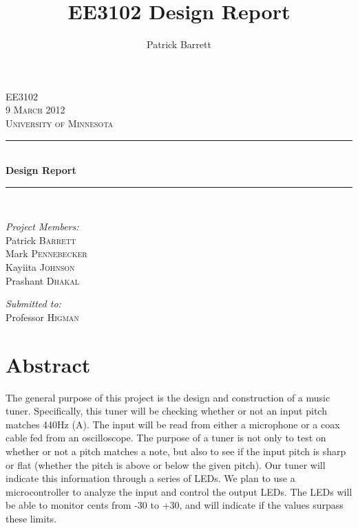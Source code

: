\documentclass[12pt]{article}
\title{EE3102 Design Report} %
\author{Patrick Barrett}
\date{}                                           %
\newcommand{\HRule}{\rule{\linewidth}{0.5mm}}
\begin{document}
\begin{singlespace}

\begin{center}
 
 

 
\textsc{\LARGE EE3102}\\[0.5cm]
 

\textsc{\Large 9 March 2012}\\[0.5cm]

\textsc{\Large University of Minnesota}\\[0.5cm]
 
 
\HRule \\[0.4cm]
{ \huge \bfseries Design Report}\\
 
\HRule \\[1cm]
 
\begin{minipage}{0.4\textwidth}
\begin{flushleft} \large
\emph{Project Members:}\\
Patrick \textsc{Barrett} \\
Mark \textsc{Pennebecker} \\
Kayiita  \textsc{Johnson} \\
Prashant \textsc{Dhakal} \\
\end{flushleft}
\end{minipage}
\begin{minipage}{0.4\textwidth}
\begin{flushright} \large
\emph{Submitted to:} \\
Professor \textsc{Higman}\\
\end{flushright}
\end{minipage}
\end{center}

\vfill

\section*{Abstract}
The general purpose of this project is the design and construction of a music tuner. Specifically, this
tuner will be checking whether or not an input pitch matches 440Hz (A). The input will be read from
either a microphone or a coax cable fed from an oscilloscope. The purpose of a tuner is not only to test
on whether or not a pitch matches a note, but also to see if the input pitch is sharp or flat (whether the
pitch is above or below the given pitch). Our tuner will indicate this information through a series of
LEDs. We plan to use a microcontroller to analyze the input and control the output LEDs. The LEDs will be able
to monitor cents from -30 to +30, and will indicate if the values surpass these limits.
\end{singlespace}
\end{document}
